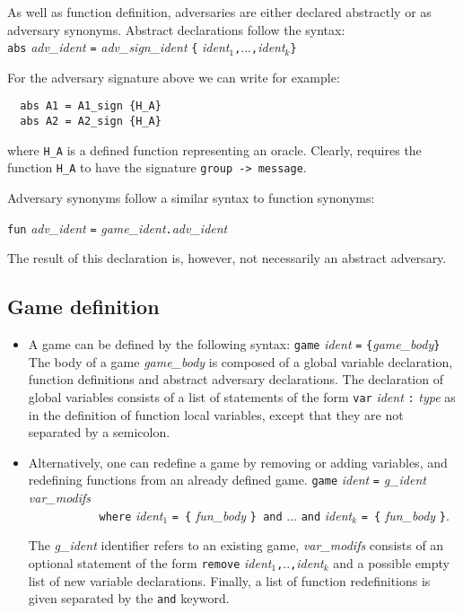 As well as function definition, adversaries are either declared abstractly
or as adversary synonyms.
Abstract declarations follow the syntax:\\
\verb+abs+ \textit{adv_ident} \verb+=+ \textit{adv_sign_ident}
\verb+{+ \textit{ident}${}_1$\verb+,+...\verb+,+\textit{ident}${}_k$\verb+}+

\noindent
For the adversary signature above we can write for example:
\begin{verbatim}
  abs A1 = A1_sign {H_A}
  abs A2 = A2_sign {H_A}
\end{verbatim}
where \verb|H_A| is a defined function representing an
oracle. Clearly, \EasyCrypt requires the function \verb|H_A| to have
the signature \verb|group -> message|.

Adversary synonyms follow a similar syntax to function synonyms:

\verb+fun+ \textit{adv_ident} \verb+=+ \textit{game_ident}\verb+.+\textit{adv_ident}

\noindent
The result of this declaration is, however, not necessarily an
abstract adversary.

\subsection{Game definition}


\begin{itemize}
\item A game can be defined by the following syntax:  
  \Syntax
  \verb+game+ \textit{ident} \verb+=+ \verb+{+\textit{game_body}\verb+}+
  The body of a game \textit{game_body} is composed of a global
  variable declaration, function definitions and abstract adversary
  declarations. The declaration of global variables consists of a list
  of statements of the form
  \verb+var+ \textit{ident} \verb+:+ \textit{type} 
  as in the definition of function local variables, except that they
  are not separated by a semicolon.
\item Alternatively, one can redefine a game by removing or adding
  variables, and redefining functions from an already defined game.
  \Syntax \verb+game+ \textit{ident} \verb+=+
  \textit{g_ident} \textit{var_modifs} \\
  \verb+           where+ \textit{ident${}_1$} \verb+= {+ \textit{fun_body} \verb+} and+ ...
  \verb+and+ \textit{ident${}_k$} \verb+= {+ \textit{fun_body} \verb+}+.

  The \textit{g_ident} identifier refers to an existing game,
  \textit{var_modifs} consists of an optional statement of the form
  \verb+remove+
  \textit{ident${}_1$}\verb+,+..\verb+,+\textit{ident${}_k$} and a
  possible empty list of new variable declarations. Finally, a list of
  function redefinitions is given separated by the \verb+and+ keyword.
\end{itemize}





